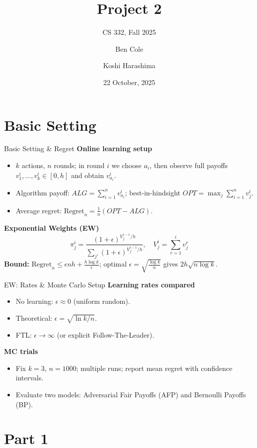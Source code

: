\documentclass{beamer}
\title[Project 2]{Project 2}
\subtitle{CS 332, Fall 2025}
\author{Ben Cole \and Koshi Harashima}
\date{22 October, 2025}
\begin{document}
\maketitle

\section{Basic Setting}

\begin{frame}{Basic Setting \& Regret}
\textbf{Online learning setup}
\begin{itemize}
  \item $k$ actions, $n$ rounds; in round $i$ we choose $a_i$, then observe full payoffs $v_1^i,\dots,v_k^i\in[0,h]$ and obtain $v_{a_i}^i$.
  \item Algorithm payoff: $ALG=\sum_{i=1}^n v_{a_i}^i$; best-in-hindsight $OPT=\max_j \sum_{i=1}^n v_j^i$.
  \item Average regret: $\mathrm{Regret}_n=\frac{1}{n}(OPT-ALG)$.
\end{itemize}
\medskip
\textbf{Exponential Weights (EW)}
\[
\pi_j^i=\frac{(1+\epsilon)^{V_j^{i-1}/h}}{\sum_{j'}(1+\epsilon)^{V_{j'}^{i-1}/h}},\quad
V_j^{i}=\sum_{r=1}^{i}v_j^r
\]
\textbf{Bound:} $\mathrm{Regret}_n\le \epsilon n h+\frac{h\log k}{\epsilon}$; optimal $\epsilon=\sqrt{\frac{\log k}{n}}$ gives $2h\sqrt{n\log k}$.
\end{frame}

\begin{frame}{EW: Rates \& Monte Carlo Setup}
\textbf{Learning rates compared}
\begin{itemize}
  \item No learning: $\epsilon\approx 0$ (uniform random).
  \item Theoretical: $\epsilon=\sqrt{\ln k / n}$.
  \item FTL: $\epsilon\to\infty$ (or explicit Follow-The-Leader).
\end{itemize}
\textbf{MC trials}
\begin{itemize}
  \item Fix $k=3$, $n=1000$; multiple runs; report mean regret with confidence intervals.
  \item Evaluate two models: Adversarial Fair Payoffs (AFP) and Bernoulli Payoffs (BP).
\end{itemize}
\end{frame}

\section{Part 1}
\end{document}
